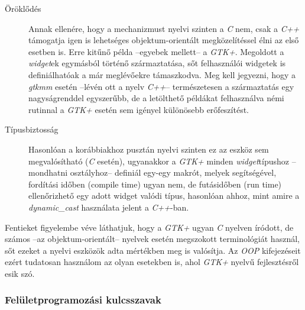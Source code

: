 \documentclass[a4paper,10pt]{article}
\begin{document}
\begin{description}
 \item[Öröklődés] Annak ellenére, hogy a mechanizmust nyelvi szinten a \textit{C} nem, csak a \textit{C++} támogatja igen is lehetséges objektum-orientált megközelítéssel élni az első esetben is. Erre kitűnő példa --egyebek mellett-- a \textit{GTK+}. Megoldott a \textit{widget}ek egymásból történő származtatása, sőt felhasználói widgetek is definiálhatóak a már meglévőekre támaszkodva. Meg kell jegyezni, hogy a \textit{gtkmm} esetén --lévén ott a nyelv \textit{C++}-- természetesen a származtatás egy nagyságrenddel egyszerűbb, de a letölthető példákat felhasználva némi rutinnal a \textit{GTK+} esetén sem igényel különösebb erőfeszítést.

 \item[Típusbiztosság] Hasonlóan a korábbiakhoz pusztán nyelvi szinten ez az eszköz sem megvalósítható (\textit{C} esetén), ugyanakkor a \textit{GTK+} minden \textit{widget}típushoz --mondhatni osztályhoz-- definiál egy-egy makrót, melyek segítségével, fordítási időben (compile time) ugyan nem, de futásidőben (run time) ellenőrizhető egy adott widget valódi típus, hasonlóan ahhoz, mint amire a \textit{dynamic\_cast} használata jelent a \textit{C++}-ban.
\end{description}

Fentieket figyelembe véve láthatjuk, hogy a \textit{GTK+} ugyan \textit{C} nyelven íródott, de számos --az objektum-orientált-- nyelvek esetén megszokott terminológiát használ, sőt ezeket a nyelvi eszközök adta mértékben meg is valósítja. Az \textit{OOP} kifejezéseit ezért tudatosan használom az olyan esetekben is, ahol \textit{GTK+} nyelvű fejlesztésről esik szó.

\subsubsection{Felületprogramozási kulcsszavak}
\end{document}

